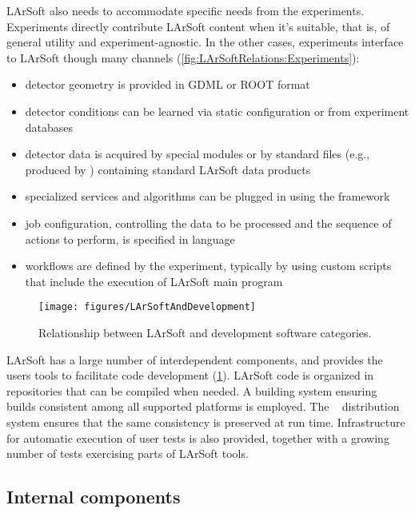 LArSoft also needs to accommodate specific needs from the experiments.
Experiments directly contribute LArSoft content when it's suitable, that is,
of general utility and experiment-agnostic.
In the other cases, experiments interface to LArSoft though many channels
(\cref{fig:LArSoftRelations:Experiments}):
\begin{itemize}
	\item detector geometry is provided in GDML or ROOT format
	\item detector conditions can be learned via static configuration or from experiment databases
	\item detector data is acquired by special \ART modules or by standard \ART files (e.g., produced by \ARTDAQ) containing standard LArSoft data products
	\item specialized services and algorithms can be plugged in using the \ART framework
	\item job configuration, controlling the data to be processed and the sequence of actions to perform,
		is specified in \FHiCL language
	\item workflows are defined by the experiment, typically by using custom scripts that include the execution of LArSoft main program
\end{itemize}
\begin{figure}
	\centering\texttt{[image: figures/LArSoftAndDevelopment]}
	\caption{\label{fig:LArSoftRelations:Development}
		Relationship between LArSoft and development software categories.
	}
\end{figure}

LArSoft has a large number of interdependent components,
and provides the users tools to facilitate code development (\cref{fig:LArSoftRelations:Development}).
LArSoft code is organized in repositories that can be compiled when needed.
A building system ensuring builds consistent among all supported platforms is employed.
The \UPS~\cite{UPS} distribution system ensures that the same consistency is preserved at run time.
Infrastructure for automatic execution of user tests is also provided,
together with a growing number of tests exercising parts of LArSoft tools.



\subsection{Internal components}
\label{ssec:Components}

